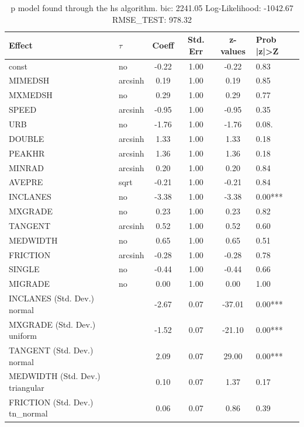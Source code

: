 \begin{table}
	\caption{p model found through the hs algorithm. bic: 2241.05 Log-Likelihood: -1042.67 RMSE_TEST: 978.32}
	\begin{center}
		\begin{tabular}{|l|l|c|c|c|l|}
			\hline
			Effect & $\tau$ & Coeff & Std. Err & z-values & Prob |z|>Z \\
			\hline
			const & no & -0.22 & 1.00 & -0.22 & 0.83 \\
			\hline
			MIMEDSH & arcsinh & 0.19 & 1.00 & 0.19 & 0.85 \\
			\hline
			MXMEDSH & no & 0.29 & 1.00 & 0.29 & 0.77 \\
			\hline
			SPEED & arcsinh & -0.95 & 1.00 & -0.95 & 0.35 \\
			\hline
			URB & no & -1.76 & 1.00 & -1.76 & 0.08. \\
			\hline
			DOUBLE & arcsinh & 1.33 & 1.00 & 1.33 & 0.18 \\
			\hline
			PEAKHR & arcsinh & 1.36 & 1.00 & 1.36 & 0.18 \\
			\hline
			MINRAD & arcsinh & 0.20 & 1.00 & 0.20 & 0.84 \\
			\hline
			AVEPRE & sqrt & -0.21 & 1.00 & -0.21 & 0.84 \\
			\hline
			INCLANES & no & -3.38 & 1.00 & -3.38 & 0.00*** \\
			\hline
			MXGRADE & no & 0.23 & 1.00 & 0.23 & 0.82 \\
			\hline
			TANGENT & arcsinh & 0.52 & 1.00 & 0.52 & 0.60 \\
			\hline
			MEDWIDTH & no & 0.65 & 1.00 & 0.65 & 0.51 \\
			\hline
			FRICTION & arcsinh & -0.28 & 1.00 & -0.28 & 0.78 \\
			\hline
			SINGLE & no & -0.44 & 1.00 & -0.44 & 0.66 \\
			\hline
			MIGRADE & no & 0.00 & 1.00 & 0.00 & 1.00 \\
			\hline
			INCLANES (Std. Dev.) normal &  & -2.67 & 0.07 & -37.01 & 0.00*** \\
			\hline
			MXGRADE (Std. Dev.) uniform &  & -1.52 & 0.07 & -21.10 & 0.00*** \\
			\hline
			TANGENT (Std. Dev.) normal &  & 2.09 & 0.07 & 29.00 & 0.00*** \\
			\hline
			MEDWIDTH (Std. Dev.) triangular &  & 0.10 & 0.07 & 1.37 & 0.17 \\
			\hline
			FRICTION (Std. Dev.) tn_normal &  & 0.06 & 0.07 & 0.86 & 0.39 \\
			\hline

\end{tabular}
\end{center}
\end{table}
